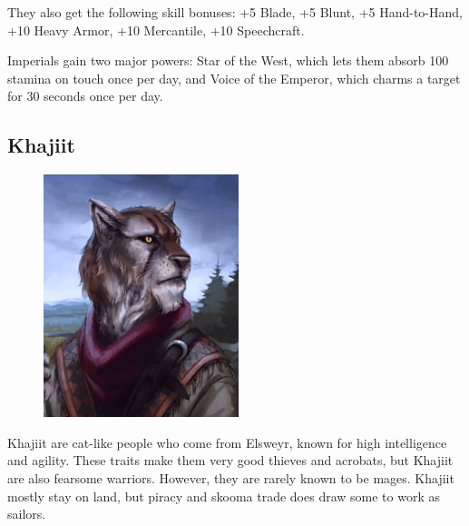 \documentclass[12pt]{book}
\begin{document}
They also get the following skill bonuses: +5 Blade, +5 Blunt, +5 Hand-to-Hand, +10 Heavy Armor, +10 Mercantile, +10 Speechcraft.

Imperials gain two major powers: Star of the West, which lets them absorb 100 stamina on touch once per day, and Voice of the Emperor, which charms a target for 30 seconds once per day.\\

\subsection{Khajiit}
\begin{figure}
	\includegraphics[width=\textwidth]{Khajiit.png}
\end{figure}

Khajiit are cat-like people who come from Elsweyr, known for high intelligence and agility. These traits make them very good thieves and acrobats, but Khajiit are also fearsome warriors. However, they are rarely known to be mages. Khajiit mostly stay on land, but piracy and skooma trade does draw some to work as sailors.
\end{document}
